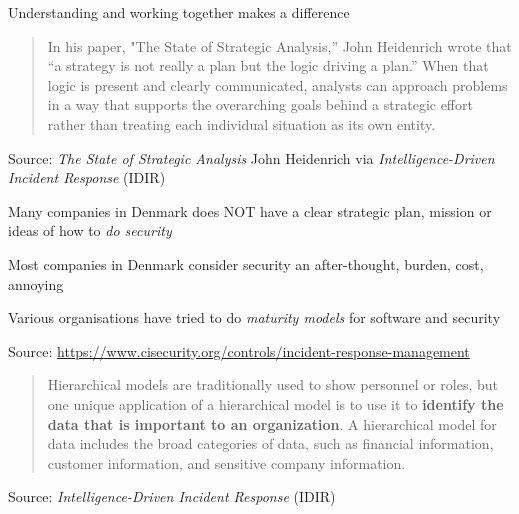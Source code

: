 \documentclass[Screen16to9,17pt]{foils}
\begin{document}
\begin{list2}
\item Understanding and working together makes a difference
\end{list2}




\begin{quote}
In his paper, "The State of Strategic Analysis,” John Heidenrich wrote that “a strategy is not really a plan but the logic driving a plan.” When that logic is present and clearly communicated, analysts can approach problems in a way that supports the overarching goals behind a strategic effort rather than treating each individual situation as its own entity.
\end{quote}
Source:
\emph{The State of Strategic Analysis} John Heidenrich via
\emph{Intelligence-Driven Incident Response} (IDIR)

\begin{list2}
\item Many companies in Denmark does NOT have a clear strategic plan, mission or ideas of how to \emph{do security}
\item Most companies in Denmark consider security an after-thought, burden, cost, annoying
\item Various organisations have tried to do \emph{maturity models} for software and security
\end{list2}


Source: \url{https://www.cisecurity.org/controls/incident-response-management}




\begin{quote}
Hierarchical models are traditionally used to show personnel or roles, but one unique application of a hierarchical model is to use it to {\bf identify the data that is important to an organization}. A hierarchical model for data includes the broad categories of data, such as financial information, customer information, and sensitive company information.
\end{quote}
Source: \emph{Intelligence-Driven Incident Response} (IDIR)


\end{document}
